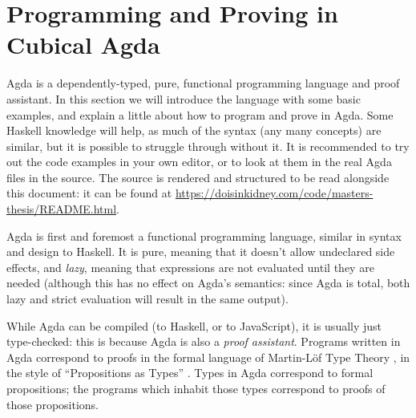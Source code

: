 \section{Programming and Proving in Cubical Agda} \label{agda-intro} Agda \citep{norellDependentlyTypedProgramming2008} is a dependently-typed, pure,
functional programming language and proof assistant.
In this section we will introduce the language with some basic examples, and
explain a little about how to program and prove in Agda.
Some Haskell knowledge will help, as much of the syntax (any many concepts) are
similar, but it is possible to struggle through without it.
It is recommended to try out the code examples in your own editor, or to look at
them in the real Agda files in the source.
The source is rendered and structured to be read alongside this document: it can
be found at \mbox{\url{https://doisinkidney.com/code/masters-thesis/README.html}}.

Agda is first and foremost a functional programming language, similar in syntax
and design to Haskell.
It is pure, meaning that it doesn't allow undeclared side effects, and
\emph{lazy}, meaning that expressions are not evaluated until they are needed
(although this has no effect on Agda's semantics: since Agda is total, both lazy
and strict evaluation will result in the same output).

While Agda can be compiled (to Haskell, or to JavaScript), it is usually just
type-checked: this is because Agda is also a \emph{proof assistant}.
Programs written in Agda correspond to proofs in the formal language of
Martin-Löf Type Theory \citep{martin-lofIntuitionisticTypeTheory1980}, in the
style of ``Propositions as Types'' \citep{wadlerPropositionsTypes2015}.
Types in Agda correspond to formal propositions; the programs which inhabit
those types correspond to proofs of those propositions.
\begin{figure}
  \centering
\end{figure}
